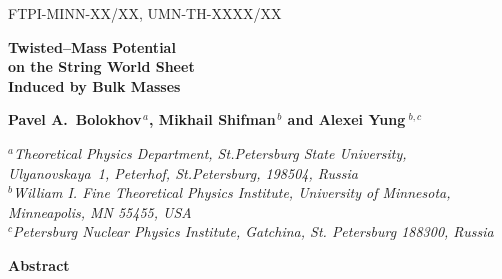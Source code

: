 \documentclass[12pt]{article}
\begin{document}
\begin{titlepage}


\begin{flushright}
FTPI-MINN-XX/XX, UMN-TH-XXXX/XX\\
\end{flushright}


\vspace{1.6cm}
\begin{center}
{\Large \bf  Twisted--Mass Potential \\
            on the String World Sheet \\[2.4mm]
             Induced by Bulk Masses}
\end{center}



\vspace{2mm}

\begin{center}

 {\large
 \bf   Pavel A.~Bolokhov$^{\,a}$,  Mikhail Shifman$^{\,b}$ and \bf Alexei Yung$^{\,\,b,c}$}
\end {center}

\begin{center}

$^a${\it Theoretical Physics Department, St.Petersburg State University, Ulyanovskaya~1, 
	 Peterhof, St.Petersburg, 198504, Russia}\\
$^b${\it  William I. Fine Theoretical Physics Institute,
University of Minnesota,
Minneapolis, MN 55455, USA}\\
$^c${\it Petersburg Nuclear Physics Institute, Gatchina, St. Petersburg
188300, Russia
}
\end{center}



\vspace{1cm}
\begin{center}
{\large\bf Abstract}
\end{center}


\end{titlepage}
\end{document}
